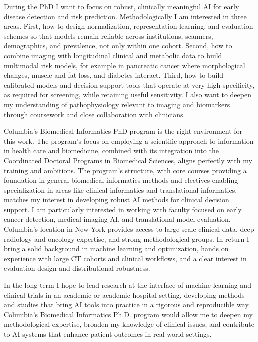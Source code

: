 \documentclass[11pt,a4paper]{article}
\begin{document}
During the PhD I want to focus on robust, clinically meaningful AI for early disease detection and risk prediction. Methodologically I am interested in three areas. First, how to design normalization, representation learning, and evaluation schemes so that models remain reliable across institutions, scanners, demographics, and prevalence, not only within one cohort. Second, how to combine imaging with longitudinal clinical and metabolic data to build multimodal risk models, for example in pancreatic cancer where morphological changes, muscle and fat loss, and diabetes interact. Third, how to build calibrated models and decision support tools that operate at very high specificity, as required for screening, while retaining useful sensitivity. I also want to deepen my understanding of pathophysiology relevant to imaging and biomarkers through coursework and close collaboration with clinicians.

Columbia's Biomedical Informatics PhD program is the right environment for this work. The program's focus on employing a scientific approach to information in health care and biomedicine, combined with its integration into the Coordinated Doctoral Programs in Biomedical Sciences, aligns perfectly with my training and ambitions. The program's structure, with core courses providing a foundation in general biomedical informatics methods and electives enabling specialization in areas like clinical informatics and translational informatics, matches my interest in developing robust AI methods for clinical decision support. I am particularly interested in working with faculty focused on early cancer detection, medical imaging AI, and translational model evaluation. Columbia's location in New York provides access to large scale clinical data, deep radiology and oncology expertise, and strong methodological groups. In return I bring a solid background in machine learning and optimization, hands on experience with large CT cohorts and clinical workflows, and a clear interest in evaluation design and distributional robustness.

In the long term I hope to lead research at the interface of machine learning and clinical trials in an academic or academic hospital setting, developing methods and studies that bring AI tools into practice in a rigorous and reproducible way. Columbia's Biomedical Informatics Ph.D. program would allow me to deepen my methodological expertise, broaden my knowledge of clinical issues, and contribute to AI systems that enhance patient outcomes in real-world settings.
\end{document}
